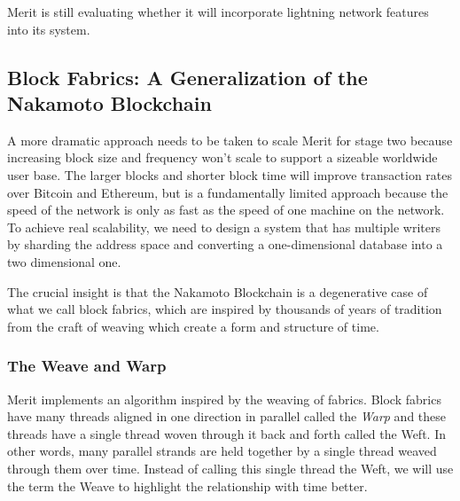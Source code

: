 \documentclass{article}
\begin{document}
Merit is still evaluating whether it will incorporate lightning network features
into its system.

\subsection{Block Fabrics: A Generalization of the Nakamoto Blockchain}

A more dramatic approach needs to be taken to scale Merit for stage two because
increasing block size and frequency won't scale to support a sizeable worldwide user base.
The larger blocks and shorter block time will improve transaction rates over Bitcoin
and Ethereum, but is a fundamentally limited approach because the speed of the network
is only as fast as the speed of one machine on the network. To achieve real scalability,
we need to design a system that has multiple writers by \gls{sharding} the address space
and converting a one-dimensional database into a two dimensional one.

The crucial insight is that the Nakamoto Blockchain is a degenerative case of what
we call \glspl{block fabric}, which are inspired by thousands of years of tradition from the
craft of weaving which create a form and structure of time.

\subsubsection{The Weave and Warp}

Merit implements an algorithm inspired by the weaving of fabrics. Block fabrics
have many threads aligned in one direction in parallel called the \emph{Warp}
and these threads have a single thread woven through it back and forth called
the Weft. In other words, many parallel strands are held together
by a single thread weaved through them over time. Instead of calling this single 
thread the Weft, we will use the term the Weave to highlight the relationship
with time better.
\end{document}
